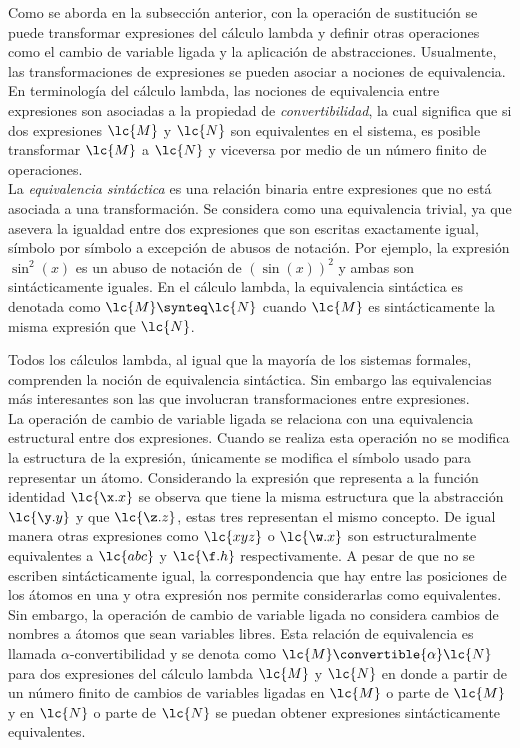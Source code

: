 Como se aborda en la subsección anterior, con la operación de sustitución se
puede transformar expresiones del cálculo lambda y definir otras operaciones
como el cambio de variable ligada y la aplicación de abstracciones. Usualmente,
las transformaciones de expresiones se pueden asociar a nociones de
equivalencia. En terminología del cálculo lambda, las nociones de equivalencia
entre expresiones son asociadas a la propiedad de \emph{convertibilidad}, la
cual significa que si dos expresiones \(\lc{M}\) y \(\lc{N}\) son equivalentes en
el sistema, es posible transformar \(\lc{M}\) a \(\lc{N}\) y viceversa por medio
de un número finito de operaciones. \\

La \emph{equivalencia sintáctica} es una relación binaria entre expresiones que
no está asociada a una transformación. Se considera como una equivalencia
trivial, ya que asevera la igualdad entre dos expresiones que son escritas
exactamente igual, símbolo por símbolo a excepción de abusos de notación. Por
ejemplo, la expresión \(\sin^{2}\left( x \right)\) es un abuso de notación de
\(\left( \sin\left( x \right) \right)^{2}\) y ambas son sintácticamente iguales.
En el cálculo lambda, la equivalencia sintáctica es denotada como \(\lc{M}
\synteq \lc{N}\) cuando \(\lc{M}\) es sintácticamente la misma expresión que
\(\lc{N}\).
\

Todos los cálculos lambda, al igual que la mayoría de los sistemas formales,
comprenden la noción de equivalencia sintáctica. Sin embargo las equivalencias
más interesantes son las que involucran transformaciones entre expresiones. \\

La operación de cambio de variable ligada se relaciona con una equivalencia
estructural entre dos expresiones. Cuando se realiza esta operación no se
modifica la estructura de la expresión, únicamente se modifica el símbolo usado
para representar un átomo. Considerando la expresión que representa a la función
identidad \(\lc{\x.x}\) se observa que tiene la misma estructura que la
abstracción \(\lc{\y.y}\) y que \(\lc{\z.z}\), estas tres representan el mismo
concepto. De igual manera otras expresiones como \(\lc{x y z}\) o \(\lc{\w.x}\)
son estructuralmente equivalentes a \(\lc{a b c}\) y \(\lc{\f.h}\)
respectivamente. A pesar de que no se escriben sintácticamente igual, la
correspondencia que hay entre las posiciones de los átomos en una y otra
expresión nos permite considerarlas como equivalentes. Sin embargo, la operación
de cambio de variable ligada no considera cambios de nombres a átomos que sean
variables libres. Esta relación de equivalencia es llamada
\(\alpha\)-convertibilidad y se denota como \(\lc{M} \convertible{\alpha}
\lc{N}\) para dos expresiones del cálculo lambda \(\lc{M}\) y \(\lc{N}\) en
donde a partir de un número finito de cambios de variables ligadas en \(\lc{M}\)
o parte de \(\lc{M}\) y en \(\lc{N}\) o parte de \(\lc{N}\) se puedan obtener
expresiones sintácticamente equivalentes. \\


